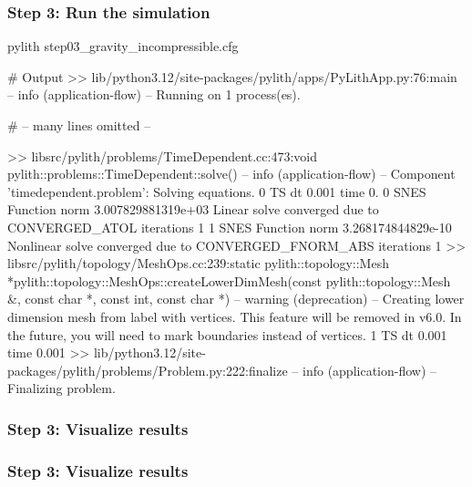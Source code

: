 \documentclass[aspectratio=169]{beamer}
\begin{document}
\begin{frame}[fragile]
  \frametitle{Step 3: Run the simulation}
  \summary{}

\begin{pyrejournal}
pylith step03_gravity_incompressible.cfg

# Output
 >> lib/python3.12/site-packages/pylith/apps/PyLithApp.py:76:main
 -- info (application-flow)
 -- Running on 1 process(es).

# -- many lines omitted --

 >> libsrc/pylith/problems/TimeDependent.cc:473:void pylith::problems::TimeDependent::solve()
 -- info (application-flow)
 -- Component 'timedependent.problem': Solving equations.
0 TS dt 0.001 time 0.
    0 SNES Function norm 3.007829881319e+03
      Linear solve converged due to CONVERGED_ATOL iterations 1
    1 SNES Function norm 3.268174844829e-10
    Nonlinear solve converged due to CONVERGED_FNORM_ABS iterations 1
 >> libsrc/pylith/topology/MeshOps.cc:239:static pylith::topology::Mesh *pylith::topology::MeshOps::createLowerDimMesh(const pylith::topology::Mesh &, const char *, const int, const char *)
 -- warning (deprecation)
 -- Creating lower dimension mesh from label with vertices. This feature will be removed in v6.0. In the future, you will need to mark boundaries instead of vertices.
1 TS dt 0.001 time 0.001
 >> lib/python3.12/site-packages/pylith/problems/Problem.py:222:finalize
 -- info (application-flow)
 -- Finalizing problem.
\end{pyrejournal}
  
\end{frame}


\begin{frame}
  \frametitle{Step 3: Visualize results}

    
\end{frame}


\begin{frame}
  \frametitle{Step 3: Visualize results}

    
\end{frame}
\end{document}

